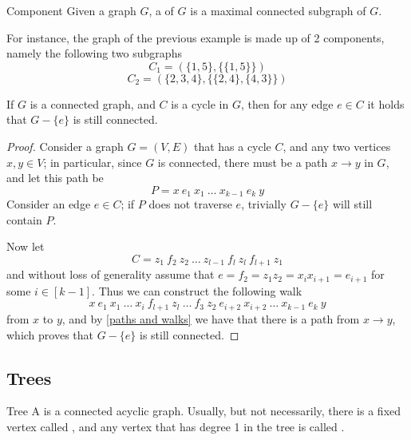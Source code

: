 \documentclass[a4paper, 12pt]{report}
\begin{document}
    \begin{frameddefn}{Component}
        Given a graph $G$, a  of $G$ is a maximal connected subgraph of $G$.
    \end{frameddefn}

    For instance, the graph of the previous example is made up of 2 components, namely the following two subgraphs $$C_1 = (\{1, 5\}, \{\{1, 5\}\})$$ $$C_2 = (\{2, 3, 4\}, \{\{2, 4\}, \{4, 3\}\})$$

    \begin{framedprop}[label={avoid cycle}]{}
        If $G$ is a connected graph, and $C$ is a cycle in $G$, then for any edge $e \in C$ it holds that $G - \{e\}$ is still connected.
    \end{framedprop}

    \begin{proof}
        Consider a graph $G = (V, E)$ that has a cycle $C$, and any two vertices $x, y \in V$; in particular, since $G$ is connected, there must be a path $x \to y$ in $G$, and let this path be $$P = x \ e_1 \ x_1 \ \ldots \ x_{k - 1} \ e_k \ y$$ Consider an edge $e \in C$; if $P$ does not traverse $e$, trivially $G - \{e\}$ will still contain $P$.

        Now let $$C = z_1 \ f_2 \ z_2 \ \ldots \ z_{l- 1} \ f_l \ z_l \ f_{l + 1} \ z_1$$ and without loss of generality assume that $e = f_2 = z_1 z_2 = x_i x_{i + 1} = e_{i + 1}$ for some $i \in [k - 1]$. Thus we can construct the following walk $$x \ e_1 \ x_1 \ \ldots \ x_i \ f_{l + 1} \ z_l \ \ldots \ f_3 \ z_2 \ e_{i + 2} \ x_{i + 2} \ \ldots \ x_{k - 1} \ e_k \ y$$ from $x$ to $y$, and by \cref{paths and walks} we have that there is a path from $x \to y$, which proves that $G - \{e\}$ is still connected.
    \end{proof}

    \subsection{Trees}

    \begin{frameddefn}{Tree}
        A  is a connected acyclic graph. Usually, but not necessarily, there is a fixed vertex called , and any vertex that has degree 1 in the tree is called .
    \end{frameddefn}
    
\end{document}
